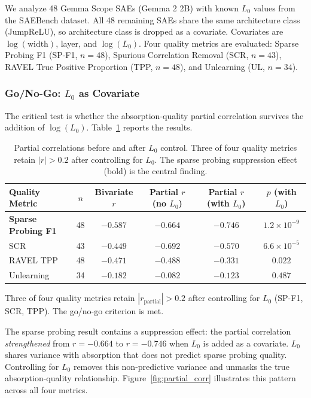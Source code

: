 \documentclass{article}
\begin{document}
We analyze 48 Gemma Scope SAEs (Gemma 2 2B) with known $L_0$ values from the SAEBench dataset.
All 48 remaining SAEs share the same architecture class (JumpReLU), so architecture class is dropped as a covariate.
Covariates are $\log(\text{width})$, layer, and $\log(L_0)$.
Four quality metrics are evaluated: Sparse Probing F1 (SP-F1, $n = 48$), Spurious Correlation Removal (SCR, $n = 43$), RAVEL True Positive Proportion (TPP, $n = 48$), and Unlearning (UL, $n = 34$).

\subsubsection{Go/No-Go: $L_0$ as Covariate}

The critical test is whether the absorption-quality partial correlation survives the addition of $\log(L_0)$.
Table~\ref{tab:partial_corr} reports the results.

\begin{table}[t]
\caption{Partial correlations before and after $L_0$ control. Three of four quality metrics retain $|r| > 0.2$ after controlling for $L_0$. The sparse probing suppression effect (bold) is the central finding.}
\label{tab:partial_corr}
\centering
\small
\begin{tabular}{@{}lccccc@{}}
\toprule
Quality Metric & $n$ & Bivariate $r$ & Partial $r$ (no $L_0$) & Partial $r$ (with $L_0$) & $p$ (with $L_0$) \\
\midrule
\textbf{Sparse Probing F1} & 48 & $-0.587$ & $-0.664$ & $\mathbf{-0.746}$ & $1.2 \times 10^{-9}$ \\
SCR & 43 & $-0.449$ & $-0.692$ & $-0.570$ & $6.6 \times 10^{-5}$ \\
RAVEL TPP & 48 & $-0.471$ & $-0.488$ & $-0.331$ & $0.022$ \\
Unlearning & 34 & $-0.182$ & $-0.082$ & $-0.123$ & $0.487$ \\
\bottomrule
\end{tabular}
\end{table}

Three of four quality metrics retain $|r_{\text{partial}}| > 0.2$ after controlling for $L_0$ (SP-F1, SCR, TPP).
The go/no-go criterion is met.

The sparse probing result contains a suppression effect: the partial correlation \emph{strengthened} from $r = -0.664$ to $r = -0.746$ when $L_0$ is added as a covariate.
$L_0$ shares variance with absorption that does not predict sparse probing quality.
Controlling for $L_0$ removes this non-predictive variance and unmasks the true absorption-quality relationship.
Figure~\ref{fig:partial_corr} illustrates this pattern across all four metrics.
\end{document}
